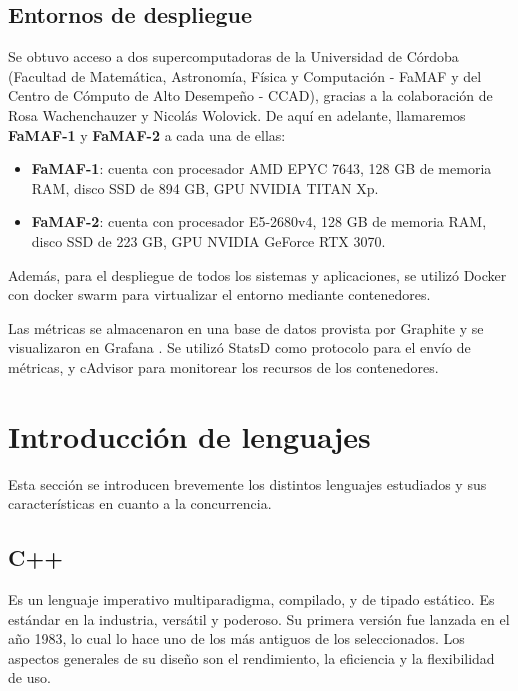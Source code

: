 \documentclass[11pt]{article}
\let\Oldsection\section
\renewcommand{\section}{\FloatBarrier\Oldsection}
\let\Oldsubsection\subsection
\renewcommand{\subsection}{\FloatBarrier\Oldsubsection}
\begin{document}
\subsection{Entornos de despliegue} \label{sec:deploy_envs}

Se obtuvo acceso a dos supercomputadoras de la Universidad de Córdoba (Facultad de Matemática, Astronomía, Física y Computación - FaMAF y del Centro de Cómputo de Alto Desempeño - CCAD), gracias a la colaboración de Rosa Wachenchauzer y Nicolás Wolovick. De aquí en adelante, llamaremos \textbf{FaMAF-1} y \textbf{FaMAF-2} a cada una de ellas:

\begin{itemize}
    \item \textbf{FaMAF-1}: cuenta con procesador AMD EPYC 7643, 128 GB de memoria RAM, disco SSD de 894 GB, GPU NVIDIA TITAN Xp.
    \item \textbf{FaMAF-2}: cuenta con procesador E5-2680v4, 128 GB de memoria RAM, disco SSD de 223 GB, GPU NVIDIA GeForce RTX 3070.
\end{itemize}

Además, para el despliegue de todos los sistemas y aplicaciones, se utilizó Docker \cite{com:docker} con docker swarm para virtualizar el entorno mediante contenedores.

Las métricas se almacenaron en una base de datos provista por Graphite \cite{com:graphite} y se visualizaron en Grafana \cite{com:grafana}. Se utilizó StatsD \cite{com:statsd} como protocolo para el envío de métricas, y cAdvisor \cite{com:cadvisor} para monitorear los recursos de los contenedores.

\newpage

\section{Introducción de lenguajes}

Esta sección se introducen brevemente los distintos lenguajes estudiados y sus características en cuanto a la concurrencia.

\subsection{C++}

Es un lenguaje imperativo multiparadigma, compilado, y de tipado estático. Es estándar en la industria, versátil y poderoso. Su primera versión fue lanzada en el año 1983, lo cual lo hace uno de los más antiguos de los seleccionados. Los aspectos generales de su diseño son el rendimiento, la eficiencia y la flexibilidad de uso.
\end{document}
